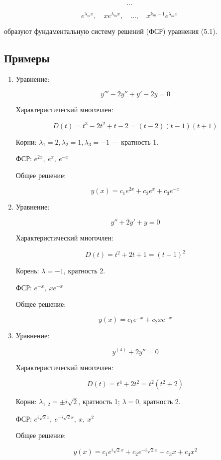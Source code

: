 {\begin{enumerate}
	

	\[
	\ldots
	\]


	

	\[
	e^{\lambda_m x},\quad x e^{\lambda_m x},\quad \ldots,\quad x^{k_m - 1} e^{\lambda_m x}
	\]


	образуют фундаментальную систему решений (ФСР) уравнения (5.1).
	\end{enumerate}


	\subsection*{Примеры}

	\begin{enumerate}
	\item Уравнение:
	

	\[
	y''' - 2y'' + y' - 2y = 0
	\]


	Характеристический многочлен:
	

	\[
	D(t) = t^3 - 2t^2 + t - 2 = (t - 2)(t - 1)(t + 1)
	\]


	Корни: \( \lambda_1 = 2, \lambda_2 = 1, \lambda_3 = -1 \) — кратность 1.

	ФСР: \( e^{2x},\ e^x,\ e^{-x} \)

	Общее решение:
	

	\[
	y(x) = c_1 e^{2x} + c_2 e^x + c_3 e^{-x}
	\]



	\item Уравнение:
	

	\[
	y'' + 2y' + y = 0
	\]


	Характеристический многочлен:
	

	\[
	D(t) = t^2 + 2t + 1 = (t + 1)^2
	\]


	Корень: \( \lambda = -1 \), кратность 2.

	ФСР: \( e^{-x},\ x e^{-x} \)

	Общее решение:
	

	\[
	y(x) = c_1 e^{-x} + c_2 x e^{-x}
	\]



	\item Уравнение:
	

	\[
	y^{(4)} + 2y'' = 0
	\]


	Характеристический многочлен:
	

	\[
	D(t) = t^4 + 2t^2 = t^2(t^2 + 2)
	\]


	Корни: \( \lambda_{1,2} = \pm i\sqrt{2} \), кратность 1; \( \lambda = 0 \), кратность 2.

	ФСР: \( e^{i\sqrt{2}x},\ e^{-i\sqrt{2}x},\ x,\ x^2 \)

	Общее решение:
	

	\[
	y(x) = c_1 e^{i\sqrt{2}x} + c_2 e^{-i\sqrt{2}x} + c_3 x + c_4 x^2
	\]


	\end{enumerate}


	\newpage
}